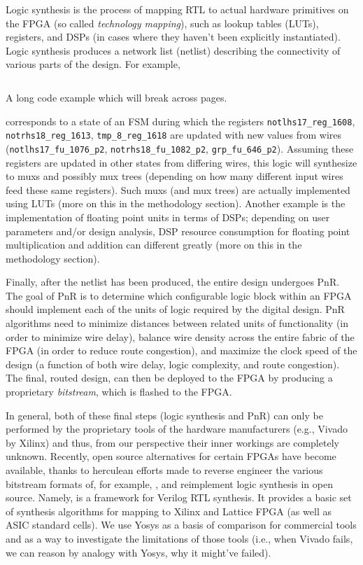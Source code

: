 Logic synthesis is the process of mapping RTL to actual hardware primitives on the FPGA (so called \emph{technology mapping}), such as lookup tables (LUTs), registers, and DSPs (in cases where they haven't been explicitly instantiated).
Logic synthesis produces a network list (netlist) describing the connectivity of various parts of the design.
For example,  
\begin{longlisting}
	\inputminted{verilog}{sources/always.v}
	\caption[Long Code Example]{A long code example which will break across pages.}
	\label{lst:long}
\end{longlisting}
\noindent corresponds to a state of an FSM during which the registers \texttt{notlhs17_reg_1608}, \texttt{notrhs18_reg_1613}, \texttt{tmp_8_reg_1618} are updated with new values from wires (\texttt{notlhs17_fu_1076_p2}, \texttt{notrhs18_fu_1082_p2}, \texttt{grp_fu_646_p2}).
Assuming these registers are updated in other states from differing wires, this logic will synthesize to muxs and possibly mux trees (depending on how many different input wires feed these same registers).
Such muxs (and mux trees) are actually implemented using LUTs (more on this in the methodology section).
Another example is the implementation of floating point units in terms of DSPs; depending on user parameters and/or design analysis, DSP resource consumption for floating point multiplication and addition can different greatly (more on this in the methodology section).

Finally, after the netlist has been produced, the entire design undergoes PnR.
The goal of PnR is to determine which configurable logic block within an FPGA should implement each of the units of logic required by the digital design.
PnR algorithms need to minimize distances between related units of functionality (in order to minimize wire delay), balance wire density across the entire fabric of the FPGA (in order to reduce route congestion), and maximize the clock speed of the design (a function of both wire delay, logic complexity, and route congestion).
The final, routed design, can then be deployed to the FPGA by producing a proprietary \emph{bitstream}, which is flashed to the FPGA.

In general, both of these final steps (logic synthesis and PnR) can only be performed by the proprietary tools of the hardware manufacturers (e.g., Vivado by Xilinx) and thus, from our perspective their inner workings are completely unknown.
Recently, open source alternatives for certain FPGAs have become available, thanks to herculean efforts made to reverse engineer the various bitstream formats of, for example, , and reimplement logic synthesis in open source.
Namely,  is a framework for Verilog RTL synthesis.
It provides a basic set of synthesis algorithms for mapping to Xilinx and Lattice FPGA (as well as ASIC standard cells).
We use Yosys as a basis of comparison for commercial tools and as a way to investigate the limitations of those tools (i.e., when Vivado fails, we can reason by analogy with Yosys, why it might've failed).